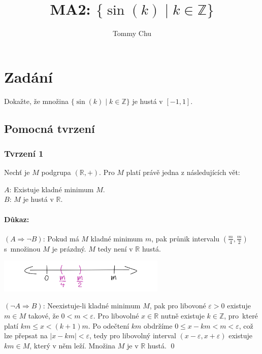 \documentclass[a4paper]{article}
\title{MA2: $\{ \sin (k) \mid k \in \mathbb{Z} \}$}
\author{Tommy Chu}
\date{}
\begin{document}
\maketitle

\section*{Zadání}

Dokažte, že množina $\{ \sin (k) \mid k \in \mathbb{Z} \}$ je hustá v $[-1, 1]$.

\subsection*{Pomocná tvrzení}

\subsubsection*{Tvrzení 1}

Nechť je $M$ podgrupa $(\mathbb{R}, +)$. Pro $M$ platí právě jedna z následujících vět:

$A$: Existuje kladné minimum $M$. \\
$B$: $M$ je hustá v $\mathbb{R}$.

\paragraph*{Důkaz:}
$(A \Rightarrow \neg B)$: Pokud má $M$ kladné minimum $m$, pak průnik intervalu $(\frac{m}{4}, \frac{m}{2})$ s~množinou $M$ je prázdný. $M$ tedy není v $\mathbb{R}$ hustá.

\begin{center}
    \includegraphics[height=1.6cm]{1a}
\end{center}

$(\neg A \Rightarrow B)$: Neexistuje-li kladné minimum $M$, pak pro libovoné $\varepsilon > 0$ existuje $m \in M$ takové, že $0 < m < \varepsilon$. Pro libovolné $x \in \mathbb{R}$ nutně existuje $k \in \mathbb{Z}$, pro~které platí $k m \leq x < (k + 1) m$. Po odečtení $km$ obdržíme ${0 \leq x - k m < m < \varepsilon}$, což lze přepsat na $|x - k m| < \varepsilon$, tedy pro libovolný interval $(x - \varepsilon, x + \varepsilon)$ existuje $km \in M$, který v něm leží. Množina $M$ je v $\mathbb{R}$ hustá.
\qed
\end{document}
